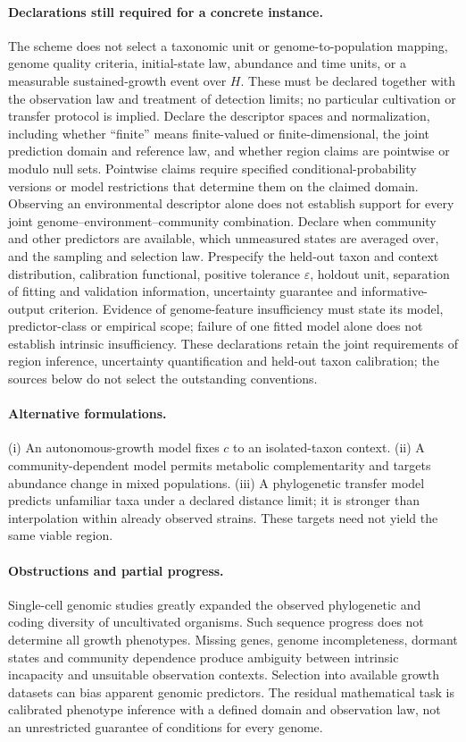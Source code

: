 \documentclass[11pt]{article}
\begin{document}
\paragraph{Declarations still required for a concrete instance.} The scheme does not select a taxonomic unit or genome-to-population mapping, genome quality criteria, initial-state law, abundance and time units, or a measurable sustained-growth event over $H$. These must be declared together with the observation law and treatment of detection limits; no particular cultivation or transfer protocol is implied. Declare the descriptor spaces and normalization, including whether ``finite'' means finite-valued or finite-dimensional, the joint prediction domain and reference law, and whether region claims are pointwise or modulo null sets. Pointwise claims require specified conditional-probability versions or model restrictions that determine them on the claimed domain. Observing an environmental descriptor alone does not establish support for every joint genome--environment--community combination. Declare when community and other predictors are available, which unmeasured states are averaged over, and the sampling and selection law. Prespecify the held-out taxon and context distribution, calibration functional, positive tolerance $\varepsilon$, holdout unit, separation of fitting and validation information, uncertainty guarantee and informative-output criterion. Evidence of genome-feature insufficiency must state its model, predictor-class or empirical scope; failure of one fitted model alone does not establish intrinsic insufficiency. These declarations retain the joint requirements of region inference, uncertainty quantification and held-out taxon calibration; the sources below do not select the outstanding conventions.

\paragraph{Alternative formulations.} (i) An autonomous-growth model fixes $c$ to an isolated-taxon context. (ii) A community-dependent model permits metabolic complementarity and targets abundance change in mixed populations. (iii) A phylogenetic transfer model predicts unfamiliar taxa under a declared distance limit; it is stronger than interpolation within already observed strains. These targets need not yield the same viable region.

\paragraph{Obstructions and partial progress.} Single-cell genomic studies greatly expanded the observed phylogenetic and coding diversity of uncultivated organisms. Such sequence progress does not determine all growth phenotypes. Missing genes, genome incompleteness, dormant states and community dependence produce ambiguity between intrinsic incapacity and unsuitable observation contexts. Selection into available growth datasets can bias apparent genomic predictors. The residual mathematical task is calibrated phenotype inference with a defined domain and observation law, not an unrestricted guarantee of conditions for every genome.
\end{document}

